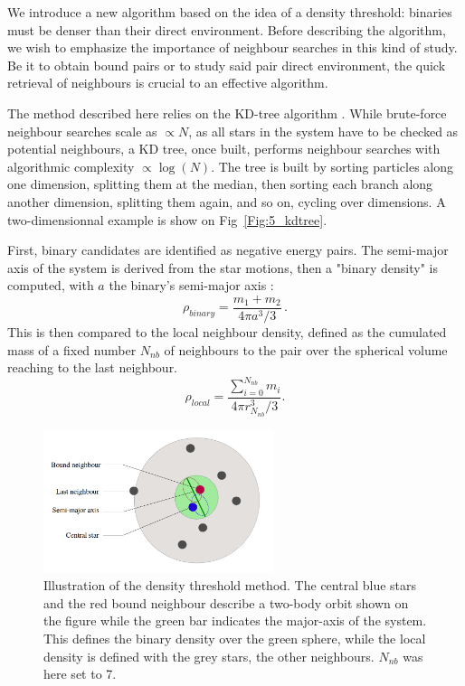 We introduce a new algorithm based on the idea of a density threshold: binaries must be denser than their direct environment. Before describing the algorithm, we wish to emphasize the importance of neighbour searches in this kind of study. Be it to obtain bound pairs or to study said pair direct environment, the quick retrieval of neighbours is crucial to an effective algorithm.

The method described here relies on the KD-tree algorithm \citep{numericalrecipes}. While brute-force neighbour searches scale as $\propto N$, as all stars in the system have to be checked as potential neighbours, a KD tree, once built, performs neighbour searches with algorithmic complexity $\propto\log (N)$. The tree is built by sorting particles along one dimension, splitting them at the median, then sorting each branch along another dimension, splitting them again, and so on, cycling over dimensions. A two-dimensionnal example is show on Fig~\ref{Fig:5_kdtree}.





First, binary candidates are identified as negative energy pairs. The semi-major axis of the system is derived from the star motions, then a "binary density" is computed, with $a$ the binary's semi-major axis :
\begin{equation}
 \rho_{binary} = \frac{m_1 + m_2 }{4\pi a^3/3 }\, .
\end{equation}
This is then compared to the local neighbour density, defined as the cumulated mass of a fixed number $N_{nb}$ of neighbours to the pair over the spherical volume reaching to the last neighbour.
\begin{equation}
 \rho_{local} =  \frac{\sum\limits_{i=0}^{N_{nb}} m_i}{ 4 \pi r_{N_{nb}}^3 /3} .
\end{equation}


\begin{figure}
\begin{center}
\includegraphics[width=0.6\textwidth]{Figures/5_neighbours}
\caption{Illustration of the density threshold method. The central blue stars and the red bound neighbour describe a two-body orbit shown on the figure while the green bar indicates the major-axis of the system. This defines the binary density over the green sphere, while the local density is defined with the grey stars, the other neighbours. $N_{nb}$ was here set to 7. }
\label{Fig:5_neighbours}
\end{center}
\end{figure}




